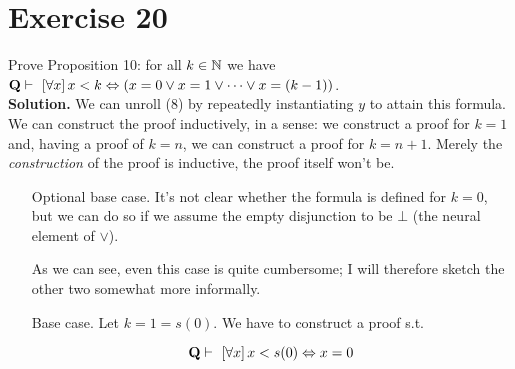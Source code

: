 \section{Exercise 20}

Prove Proposition 10: for all $k \in \N$ we have $\proves{\bQ}{\allQ{x} x < k \Leftrightarrow (x = 0 \vee x = 1 \vee \dots \vee x = (k - 1))}$.\\

\noindent
\textbf{Solution.} We can unroll (8) by repeatedly instantiating $y$ to attain this formula. We can construct the proof inductively, in a sense: we construct a proof for $k = 1$ and, having a proof of $k = n$, we can construct a proof for $k = n+1$. Merely the {\em construction} of the proof is inductive, the proof itself won't be.

\begin{enumerate}
	\item[Optional base case.] It's not clear whether the formula is defined for $k=0$, but we can do so if we assume the empty disjunction to be $\bot$ (the neural element of $\vee$).
	
	\begin{prooftree}
		
		
	\end{prooftree}
	
	As we can see, even this case is quite cumbersome; I will therefore sketch the other two somewhat more informally.
	
	\item[Base case.] Let $k=1=s(0)$. We have to construct a proof s.t.
	
	$$
		\proves{\bQ}{\allQ{x} x < s(0) \Leftrightarrow x = 0}
	$$
	

\end{enumerate}
